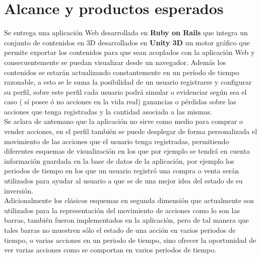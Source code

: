 \chapter{Alcance y productos esperados}
Se entrega una aplicación Web desarrollada en \textbf{Ruby on Rails} que integra un conjunto de contenidos en 3D desarrollados en \textbf{Unity 3D} un motor gráfico que permite exportar los contenidos para que sean acoplados con la aplicación Web y consecuentemente se puedan visualizar desde un navegador. Además los contenidos se estarán actualizando constantemente en un período de tiempo razonable, a esto se le suma la posibilidad de un usuario registrarse y configurar su perfil, sobre este perfil cada usuario podrá simular o evidenciar según sea el caso ( sí posee ó no acciones en la vida real) ganancias o pérdidas sobre las acciones que tenga registradas y la cantidad asociada a las mismas.\\

Se  aclara de antemano que la aplicación no sirve como medio para comprar o vender acciones, en el perfil también se puede desplegar de forma personalizada el movimiento de las acciones que el usuario tenga registradas, permitiendo diferentes esquemas de visualización en los que por ejemplo se tendrá en cuenta información guardada en la base de datos de la aplicación, por ejemplo los periodos de tiempo en los que un usuario registró una compra o venta serán utilizados para ayudar  al usuario a que se de una mejor idea del estado de su inversión.\\

Adicionalmente los clásicos esquemas en segunda dimensión que actualmente son utilizados para la representación del movimiento de acciones como lo son las barras, también fueron implementados en la aplicación, pero de tal manera que tales barras no muestren sólo el estado de una acción en varios periodos de tiempo, o varias acciones en un periodo de tiempo, sino ofrecer la oportunidad de ver varias acciones como se comportan en varios periodos de tiempo.